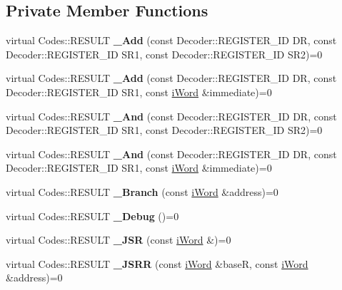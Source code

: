 \subsection*{Private Member Functions}
\begin{DoxyCompactItemize}
\item 
\hypertarget{classiWi11_a65f699c773084a631cd7373cae05b5da}{
virtual Codes::RESULT {\bfseries \_\-Add} (const Decoder::REGISTER\_\-ID DR, const Decoder::REGISTER\_\-ID SR1, const Decoder::REGISTER\_\-ID SR2)=0}
\label{classiWi11_a65f699c773084a631cd7373cae05b5da}

\item 
\hypertarget{classiWi11_a6345dc089e3a699bd30fc442bd8f6d85}{
virtual Codes::RESULT {\bfseries \_\-Add} (const Decoder::REGISTER\_\-ID DR, const Decoder::REGISTER\_\-ID SR1, const \hyperlink{classiWord}{iWord} \&immediate)=0}
\label{classiWi11_a6345dc089e3a699bd30fc442bd8f6d85}

\item 
\hypertarget{classiWi11_a90cd8f3daa1788f029cabe198c19efb3}{
virtual Codes::RESULT {\bfseries \_\-And} (const Decoder::REGISTER\_\-ID DR, const Decoder::REGISTER\_\-ID SR1, const Decoder::REGISTER\_\-ID SR2)=0}
\label{classiWi11_a90cd8f3daa1788f029cabe198c19efb3}

\item 
\hypertarget{classiWi11_a4785e197f77fb0861e97e8d18c3be96f}{
virtual Codes::RESULT {\bfseries \_\-And} (const Decoder::REGISTER\_\-ID DR, const Decoder::REGISTER\_\-ID SR1, const \hyperlink{classiWord}{iWord} \&immediate)=0}
\label{classiWi11_a4785e197f77fb0861e97e8d18c3be96f}

\item 
\hypertarget{classiWi11_a42d2c50609424634873413d7a6614397}{
virtual Codes::RESULT {\bfseries \_\-Branch} (const \hyperlink{classiWord}{iWord} \&address)=0}
\label{classiWi11_a42d2c50609424634873413d7a6614397}

\item 
\hypertarget{classiWi11_ae510f127a0c3b87d42cdbe5b14204a65}{
virtual Codes::RESULT {\bfseries \_\-Debug} ()=0}
\label{classiWi11_ae510f127a0c3b87d42cdbe5b14204a65}

\item 
\hypertarget{classiWi11_a0e1e16df5483aaa32e004fe125f95f70}{
virtual Codes::RESULT {\bfseries \_\-JSR} (const \hyperlink{classiWord}{iWord} \&)=0}
\label{classiWi11_a0e1e16df5483aaa32e004fe125f95f70}

\item 
\hypertarget{classiWi11_aeabd561f2728e2345b6a5ae5cdd5b84a}{
virtual Codes::RESULT {\bfseries \_\-JSRR} (const \hyperlink{classiWord}{iWord} \&baseR, const \hyperlink{classiWord}{iWord} \&address)=0}
\label{classiWi11_aeabd561f2728e2345b6a5ae5cdd5b84a}


\end{DoxyCompactItemize}
